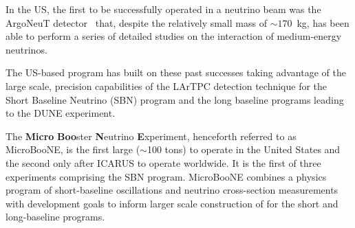 In the US, the first \lartpc to be successfully operated in a neutrino beam was the ArgoNeuT detector~\cite{Anderson:2012-argoneut} that, despite the relatively small mass of $\sim170$~kg, has been able to perform a series of detailed studies on the interaction of medium-energy neutrinos\cite{Acciarri:2013-argoneut-recomb,Anderson:2012-argoneut-CCincl,Acciarri:2014-argoneut-CCxsec,Acciarri:2014-argoneut-CCcohpi}.    



The US-based program has built on these past successes taking advantage of the large scale, precision capabilities of the LArTPC detection technique for the Short Baseline Neutrino (SBN) program and the long baseline programs leading to the DUNE experiment.

The {\bf{Micro}} {\bf{Boo}}ster {\bf{N}}eutrino {\bf{E}}xperiment, henceforth referred to as MicroBooNE, is the first large ($\sim$100 tons) \lartpc to operate in the United States and the second only after ICARUS to operate worldwide.   It is the first of three experiments comprising the SBN program.  MicroBooNE combines a physics program of short-baseline oscillations and neutrino cross-section measurements with development goals to inform larger scale construction of \lartpcs for the short and long-baseline programs.  


